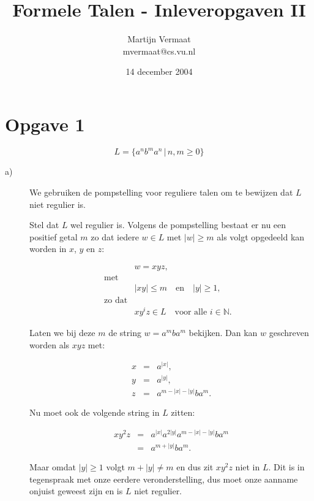 \documentclass[a4paper,11pt]{article}
\title{Formele Talen - Inleveropgaven II}
\author{
    Martijn Vermaat\\
    mvermaat@cs.vu.nl
}
\date{14 december 2004}
\begin{document}
\maketitle


\section*{Opgave 1}


\begin{displaymath}
L = \{a^{n}b^{m}a^{n} \, | \, n,m \geq 0\}
\end{displaymath}


\begin{description}


\item[a)]

We gebruiken de pompstelling voor reguliere talen om te bewijzen dat $L$ niet
regulier is.

Stel dat $L$ wel regulier is. Volgens de pompstelling bestaat er nu een
positief getal $m$ zo dat iedere $w \in L$ met $|w| \geq m$ als volgt
opgedeeld kan worden in $x$, $y$ en $z$:

\begin{eqnarray*}
& w = xyz \mbox{,} & \\
\mbox{met} & & \\
& |xy| \leq m \quad \mbox{en} \quad |y| \geq 1 \mbox{,} & \\
\mbox{zo dat} & & \\
& xy^{i}z \in L \quad \mbox{voor alle $i \in \mathbb{N}$.} &
\end{eqnarray*}

Laten we bij deze $m$ de string $w = a^{m}ba^{m}$ bekijken. Dan kan $w$
geschreven worden als $xyz$ met:

\begin{eqnarray*}
x & = & a^{|x|} \mbox{,} \\
y & = & a^{|y|} \mbox{,} \\
z & = & a^{m-|x|-|y|}ba^{m} \mbox{.}
\end{eqnarray*}

Nu moet ook de volgende string in $L$ zitten:

\begin{eqnarray*}
xy^{2}z & = & a^{|x|}a^{2|y|}a^{m-|x|-|y|}ba^{m} \\
 & = & a^{m+|y|}ba^{m} \mbox{.}
\end{eqnarray*}

Maar omdat $|y| \geq 1$ volgt $m+|y| \not = m$ en dus zit $xy^{2}z$ niet
in $L$. Dit is in tegenspraak met onze eerdere veronderstelling, dus moet
onze aanname onjuist geweest zijn en is $L$ niet regulier.


\end{description}
\end{document}
